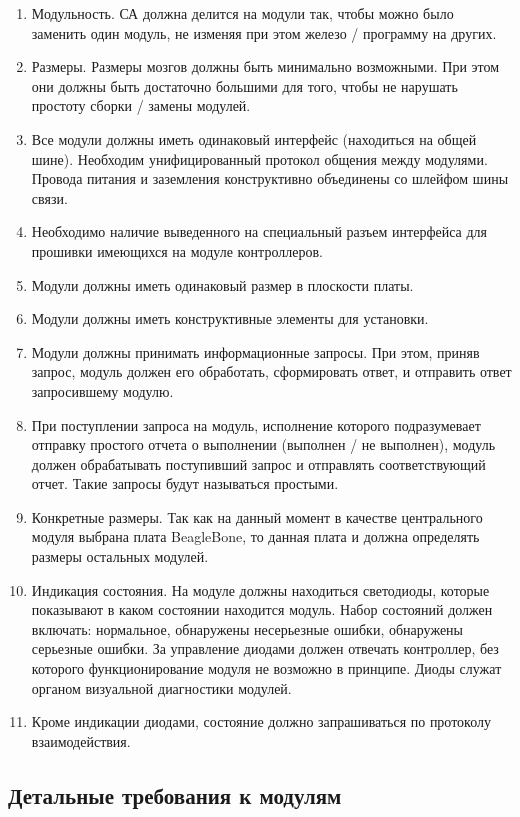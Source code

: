 \documentclass[utf8]{report}
\begin{document}
\begin{enumerate}
  \item Модульность. СА должна делится на модули так, чтобы можно было заменить один модуль, не изменяя при этом железо / программу на других.
  \item Размеры. Размеры мозгов должны быть минимально возможными. При этом они должны быть достаточно большими для того, чтобы не нарушать простоту сборки / замены модулей.
  \item Все модули должны иметь одинаковый интерфейс (находиться на общей шине). Необходим унифицированный протокол общения между модулями. Провода питания и заземления конструктивно объединены со шлейфом шины связи.
  \item Необходимо наличие выведенного на специальный разъем интерфейса для прошивки имеющихся на модуле контроллеров.
  \item Модули должны иметь одинаковый размер в плоскости платы.
  \item Модули должны иметь конструктивные элементы для установки.
  \item Модули должны принимать информационные запросы. При этом, приняв запрос, модуль должен его обработать, сформировать ответ, и отправить ответ запросившему модулю.
  \item При поступлении запроса на модуль, исполнение которого подразумевает отправку простого отчета о выполнении (выполнен / не выполнен), модуль должен обрабатывать поступивший запрос и отправлять соответствующий отчет. Такие запросы будут называться простыми.
  \item Конкретные размеры. Так как на данный момент в качестве центрального модуля выбрана плата BeagleBone, то данная плата и должна определять размеры остальных модулей.
  \item Индикация состояния. На модуле должны находиться светодиоды, которые показывают в каком состоянии находится модуль. Набор состояний должен включать: нормальное, обнаружены несерьезные ошибки, обнаружены серьезные ошибки. За управление диодами должен отвечать контроллер, без которого функционирование модуля не возможно в принципе. Диоды служат органом визуальной диагностики модулей.
  \item Кроме индикации диодами, состояние должно запрашиваться по протоколу взаимодействия.
\end{enumerate}

\subsection{Детальные требования к модулям}
\end{document}
